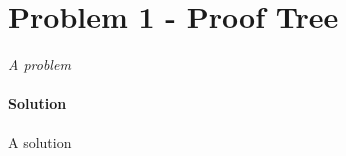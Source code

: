 \section{Problem 1 - Proof Tree} %
\label{sec:problem_1_proof_tree}

\textit{A problem}

\paragraph{Solution} %
\label{par:solution}

A solution

